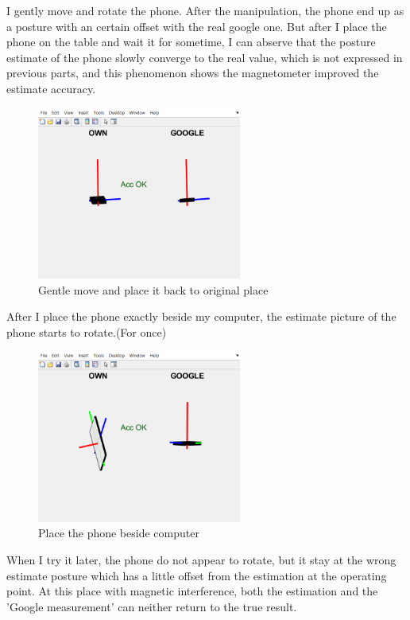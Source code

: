 I gently move and rotate the phone. After the manipulation, the phone end up as a posture with an certain offset with the real google one. But after I place the phone on the table and wait it for sometime, I can abserve that the posture estimate of the phone slowly converge to the real value, which is not expressed in previous parts, and this phenomenon shows the magnetometer improved the estimate accuracy.

\begin{figure}[H]
 \centering
 \includegraphics[width=0.6\textwidth]{images/maggentle.png}
 \caption{Gentle move and place it back to original place}
 \label{gentlemag}
\end{figure}

After I place the phone exactly beside my computer, the estimate picture of the phone starts to rotate.(For once)



\begin{figure}[H]
 \centering
 \includegraphics[width=0.6\textwidth]{images/rotatebesidecomputer.png}
 \caption{Place the phone beside computer}
 \label{rotatemag}
\end{figure}


When I try it later, the phone do not appear to rotate, but it stay at the wrong estimate posture which has a little offset from the estimation at the operating point. At this place with magnetic interference, both the estimation and the 'Google measurement' can neither return to the true result.

